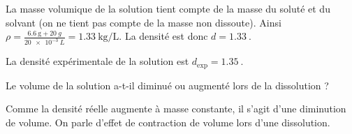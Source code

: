 \begin{corrige}
La masse volumique de la solution tient compte de la masse du soluté et du solvant (on ne tient pas compte de la masse non dissoute). Ainsi $\rho=\frac{\SI{6,6}{\gram}+\SI{20}{g}}{\SI{20e-3}{L}}=\SI{1,33}{\kg\per\liter}$. La densité est donc $d=\SI{1,33}{}$.
\end{corrige}



\begin{enonce}
La densité expérimentale de la solution est $d_{\text{exp}}=\SI{1,35}{}$. \minusBigskip

Le volume de la solution a-t-il diminué ou augmenté lors de la dissolution ?
\end{enonce}


\begin{corrige}
Comme la densité réelle augmente à masse constante, il s'agit d'une diminution de volume. On parle d'effet de contraction de volume lors d'une dissolution.
\end{corrige}




\finEntrainement






\hauteurLargeurCadreReponse		{5mm}{1.5cm}
\typeEntrainement				{} %
\initialisationEntrainement

